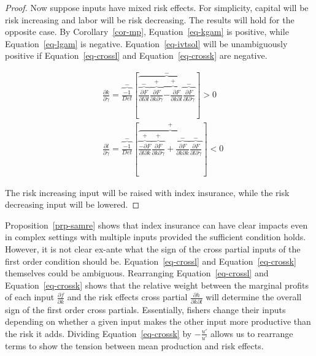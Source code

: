 \documentclass[
  letterpaper,
  DIV=11,
  numbers=noendperiod]{scrartcl}
\theoremstyle{plain}
\theoremstyle{plain}
\theoremstyle{remark}
\begin{document}
\begin{proof}
Now suppose inputs have mixed risk effects. For simplicity, capital will
be risk increasing and labor will be risk decreasing. The results will
hold for the opposite case. By Corollary~\ref{cor-mp},
Equation~\ref{eq-kgam} is positive, while Equation~\ref{eq-lgam} is
negative. Equation~\ref{eq-ivtsol} will be unambiguously positive if
Equation~\ref{eq-crossl} and Equation~\ref{eq-crossk} are negative.

\[
\begin{aligned}
&\frac{\partial k}{\partial \gamma}=\overbrace{\frac{-1}{Det}}^{-}\left[\overbrace{\overbrace{\frac{\partial F}{\partial l \partial l}}^{-}\overbrace{\frac{\partial F}{\partial k \partial \gamma}}^{+}\overbrace{-\frac{\partial F}{\partial k \partial l}}^{+}\overbrace{\frac{\partial F}{\partial l \partial \gamma}}^{-}}^{-}\right] >0\\
&\frac{\partial l}{\partial \gamma}=\overbrace{\frac{-1}{Det}}^{-}\left[\overbrace{\overbrace{\frac{-\partial F}{\partial l \partial k}}^{+}\overbrace{\frac{\partial F}{\partial k \partial \gamma}}^{+}+\overbrace{\frac{\partial F}{\partial k \partial k}}^{-}\overbrace{\frac{\partial F}{\partial l \partial \gamma}}^{-}}^{+}\right]<0
\end{aligned}
\]

The risk increasing input will be raised with index insurance, while the
risk decreasing input will be lowered.

\end{proof}

Proposition~\ref{prp-samre} shows that index insurance can have clear
impacts even in complex settings with multiple inputs provided the
sufficient condition holds. However, it is not clear ex-ante what the
sign of the cross partial inputs of the first order condition should be.
Equation~\ref{eq-crossl} and Equation~\ref{eq-crossk} themselves could
be ambiguous. Rearranging Equation~\ref{eq-crossl} and
Equation~\ref{eq-crossk} shows that the relative weight between the
marginal profits of each input \(\frac{\partial f}{\partial k}\) and the
risk effects cross partial \(\frac{\partial h}{\partial k \partial l}\)
will determine the overall sign of the first order cross partials.
Essentially, fishers change their inputs depending on whether a given
input makes the other input more productive than the risk it adds.
Dividing Equation~\ref{eq-crossk} by \(-\frac{u'}{u'}\) allows us to
rearrange terms to show the tension between mean production and risk
effects.
\end{document}
